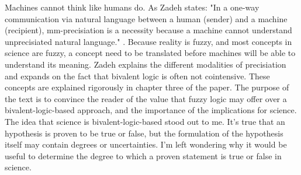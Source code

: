 


Machines cannot think like humans do. As Zadeh states: "In a one-way communication via natural language between a human (sender) and a machine (recipient), mm-precisiation is a necessity because a machine cannot understand unprecisiated natural language." \cite[2760]{is_there_a_need_for_fuzzy_logic}. Because reality is fuzzy, and most concepts in science are fuzzy, a concept need to be translated before machines will be able to understand its meaning.
Zadeh explains the different modalities of precisiation and expands on the fact that bivalent logic is often not cointensive. These concepts are explained rigorously in chapter three of the paper.
The purpose of the text is to convince the reader of the value that fuzzy logic may offer over a bivalent-logic-based approach, and the importance of the implications for science. \\

The idea that science is bivalent-logic-based stood out to me. It's true that an hypothesis is proven to be true or false, but the formulation of the hypothesis itself may contain degrees or uncertainties. I'm left wondering why it would be useful to determine the degree to which a proven statement is true or false in science. \\

